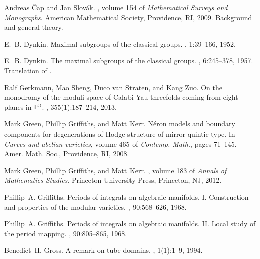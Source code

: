 \documentclass[12pt]{amsart}
\numberwithin{equation}{section}
\numberwithin{table}{section}
\numberwithin{figure}{section}
\begin{document}
\def\cprime{$'$} \def\Dbar{\leavevmode\lower.6ex\hbox to 0pt{\hskip-.23ex
  \accent"16\hss}D}
\begin{thebibliography}{10}

Andreas {\v{C}}ap and Jan Slov{\'a}k.
, volume 154 of {\em Mathematical
  Surveys and Monographs}.
\newblock American Mathematical Society, Providence, RI, 2009.
\newblock Background and general theory.

E.~B. Dynkin.
\newblock Maximal subgroups of the classical groups.
, 1:39--166, 1952.

E.~B. Dynkin.
\newblock The maximal subgroups of the classical groups.
, 6:245--378, 1957.
\newblock Translation of \cite{MR0049903}.

Ralf Gerkmann, Mao Sheng, Duco van Straten, and Kang Zuo.
\newblock On the monodromy of the moduli space of {C}alabi-{Y}au threefolds
  coming from eight planes in {$\Bbb{P}^3$}.
, 355(1):187--214, 2013.

Mark Green, Phillip Griffiths, and Matt Kerr.
\newblock N\'eron models and boundary components for degenerations of {H}odge
  structure of mirror quintic type.
\newblock In {\em Curves and abelian varieties}, volume 465 of {\em Contemp.
  Math.}, pages 71--145. Amer. Math. Soc., Providence, RI, 2008.

Mark Green, Phillip Griffiths, and Matt Kerr.
, volume 183 of {\em Annals of Mathematics Studies}.
\newblock Princeton University Press, Princeton, NJ, 2012.

Phillip~A. Griffiths.
\newblock Periods of integrals on algebraic manifolds. {I}. {C}onstruction and
  properties of the modular varieties.
, 90:568--626, 1968.

Phillip~A. Griffiths.
\newblock Periods of integrals on algebraic manifolds. {II}. {L}ocal study of
  the period mapping.
, 90:805--865, 1968.

Benedict~H. Gross.
\newblock A remark on tube domains.
, 1(1):1--9, 1994.


\end{thebibliography}
\end{document}
